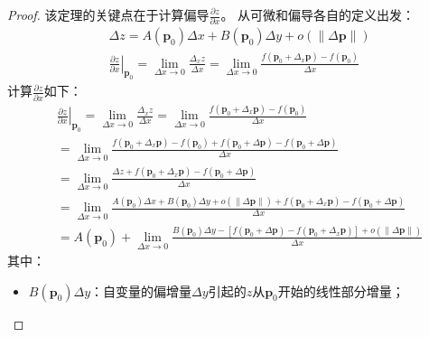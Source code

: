 \begin{proof}
该定理的关键点在于计算偏导$\frac{\partial z}{\partial x}$。
从可微和偏导各自的定义出发：
\begin{align*}
&\Delta z=A\left( \boldsymbol{p}_0 \right) \Delta x+B\left( \boldsymbol{p}_0 \right) \Delta y+o\left( \left\| \Delta \boldsymbol{p} \right\| \right) \\
&\left. \frac{\partial z}{\partial x} \right|_{\boldsymbol{p}_0}=\underset{\Delta x\rightarrow 0}{\lim}\frac{\Delta _xz}{\Delta x}=\underset{\Delta x\rightarrow 0}{\lim}\frac{f\left( \boldsymbol{p}_0+\Delta _x\boldsymbol{p} \right) -f\left( \boldsymbol{p}_0 \right)}{\Delta x}
\end{align*}
计算$\frac{\partial z}{\partial x}$如下：
\begin{align*}
&\left. \frac{\partial z}{\partial x} \right|_{\boldsymbol{p}_0}=\underset{\Delta x\rightarrow 0}{\lim}\frac{\Delta _xz}{\Delta x}=\underset{\Delta x\rightarrow 0}{\lim}\frac{f\left( \boldsymbol{p}_0+\Delta _x\boldsymbol{p} \right) -f\left( \boldsymbol{p}_0 \right)}{\Delta x} \\
&=\underset{\Delta x\rightarrow 0}{\lim}\frac{f\left( \boldsymbol{p}_0+\Delta _x\boldsymbol{p} \right) -f\left( \boldsymbol{p}_0 \right) +f\left( \boldsymbol{p}_0+\Delta \boldsymbol{p} \right) -f\left( \boldsymbol{p}_0+\Delta \boldsymbol{p} \right)}{\Delta x} \\
&=\underset{\Delta x\rightarrow 0}{\lim}\frac{\Delta z+f\left( \boldsymbol{p}_0+\Delta _x\boldsymbol{p} \right) -f\left( \boldsymbol{p}_0+\Delta \boldsymbol{p} \right)}{\Delta x} \\
&=\underset{\Delta x\rightarrow 0}{\lim}\frac{A\left( \boldsymbol{p}_0 \right) \Delta x+B\left( \boldsymbol{p}_0 \right) \Delta y+o\left( \left\| \Delta \boldsymbol{p} \right\| \right) +f\left( \boldsymbol{p}_0+\Delta _x\boldsymbol{p} \right) -f\left( \boldsymbol{p}_0+\Delta \boldsymbol{p} \right)}{\Delta x} \\
&=A\left( \boldsymbol{p}_0 \right) +\underset{\Delta x\rightarrow 0}{\lim}\frac{B\left( \boldsymbol{p}_0 \right) \Delta y-\left[ f\left( \boldsymbol{p}_0+\Delta \boldsymbol{p} \right) -f\left( \boldsymbol{p}_0+\Delta _x\boldsymbol{p} \right) \right] +o\left( \left\| \Delta \boldsymbol{p} \right\| \right)}{\Delta x}
\end{align*}
其中：
\begin{itemize}
    \item $B\left( \boldsymbol{p}_0 \right) \Delta y$：自变量的偏增量$\Delta y$引起的$z$从$\boldsymbol{p}_0$开始的线性部分增量；

\end{itemize}
\end{proof}
